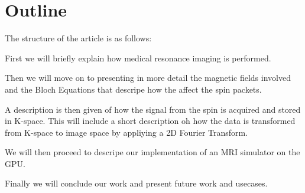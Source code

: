 



\section{Outline}

The structure of the article is as follows:

First we will briefly explain how medical resonance imaging is
performed.

Then we will move on to presenting in more detail the magnetic fields
involved and the Bloch Equations that descripe how the affect the spin
packets.

A description is then given of how the signal from the spin is
acquired and stored in K-space. This will include a short description
oh how the data is transformed from K-space to image space by
appliying a 2D Fourier Transform.

We will then proceed to descripe our implementation of an MRI
simulator on the GPU.

Finally we will conclude our work and present future work and
usecases.

